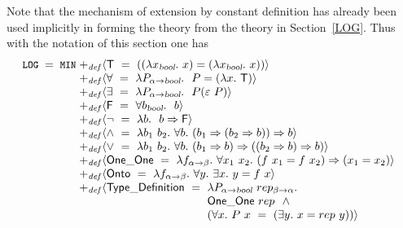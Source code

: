 Note that the mechanism of extension by constant definition has
already been used implicitly in forming the theory  from
the theory  in Section~\ref{LOG}. Thus with the notation
of this section one has
\[
\theory{LOG}\; =\; \theory{MIN}\;\begin{array}[t]{@{}l}
   {+_{\it def}} \langle \T\index{T@\holtxt{T}!abstract form of}\index{truth values, in HOL logic@truth values, in \HOL{} logic!abstract form of} \ =\
     ((\lquant{x_{\ty{bool}}}x) = (\lquant{x_{\ty{bool}}}x))\rangle\\
   {+_{\it def}}\langle {\forall}\index{universal quantifier, in HOL logic@universal quantifier, in \HOL{} logic!abstract form of}\ =\ \lquant{P_{\alpha\fun\ty{bool}}}\ P =
     (\lquant{x}\T )\rangle\\
   {+_{\it def}}\langle {\exists}\index{existential quantifier, in HOL logic@existential quantifier, in \HOL{} logic!abstract form of}\ =\
     \lquant{P_{\alpha\fun\ty{bool}}}\ P({\hilbert}\ P)\rangle\\
   {+_{\it def}}\langle \F\index{F@\holtxt{F}!abstract form of}
 \ =\ \uquant{b_{\ty{bool}}}\ b\rangle\\
   {+_{\it def}}\langle \neg\ =\ \lquant{b}\ b \imp \F \rangle\index{negation, in HOL logic@negation, in \HOL{} logic!abstract form of}\\
   {+_{\it def}}\langle {\wedge}\index{conjunction, in HOL logic@conjunction, in \HOL{} logic!abstract form of}\ =\ \lquant{b_1\ b_2}\uquant{b}
     (b_1\imp (b_2 \imp b)) \imp b\rangle\\
   {+_{\it def}}\langle {\vee}\index{disjunction, in HOL logic@disjunction, in \HOL{} logic!abstract form of}\ =\ \lquant{b_1\ b_2}\uquant{b}
     (b_1 \imp b)\imp ((b_2 \imp b) \imp b)\rangle\\
   {+_{\it def}}\langle\OneOne \ =\ \lquant{f_{\alpha \fun\beta}}
     \uquant{x_1\ x_2} (f\ x_1 = f\ x_2)  \imp (x_1 = x_2)\rangle\index{one-to-one predicate, in HOL logic@one-to-one predicate, in \HOL{} logic!abstract form of}\\
   {+_{\it def}}\langle\Onto \  =\ \lquant{f_{\alpha\fun\beta}}\index{onto predicate, in HOL logic@onto predicate, in \HOL{} logic!abstract form of}
     \uquant{y}\equant{x} y = f\ x\rangle\\
   {+_{\it def}}\langle\TyDef \  =\
        \begin{array}[t]{@{}l}
          \lambda P_{\alpha\fun\ty{bool}}\ rep_{\beta\fun\alpha}.\\
          \OneOne\ rep\ \ \wedge\\
          (\uquant{x}P\ x \ =\ (\equant{y} x = rep\ y)) \rangle\\
\end{array}\end{array}
\]

